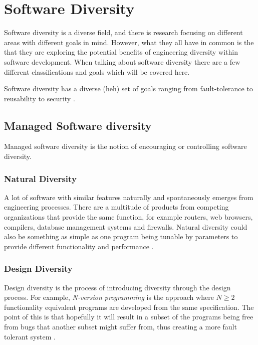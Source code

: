 \section{Software Diversity}

Software diversity is a diverse field, and there is research focusing on different areas
with different goals in mind. However, what they all have in common is the that they are
exploring the potential benefits of engineering diversity within software development.
When talking about software diversity there are a few different classifications and goals
\cite[Section~1]{survey} which will be covered here.

Software diversity has a diverse (heh) set of goals ranging from fault-tolerance to reusability
to security \cite{survey}.

\subsection{Managed Software diversity}

Managed software diversity is the notion of encouraging or controlling software diversity.

\subsubsection{Natural Diversity}

A lot of software with similar features naturally and spontaneously emerges from engineering
processes. There are a multitude of products from competing organizations that provide
the same function, for example routers, web browsers, compilers, database management systems
and firewalls. Natural diversity could also be something as simple as one program being
tunable by parameters to provide different functionality and performance \cite{survey}.

\subsubsection{Design Diversity}

Design diversity is the process of introducing diversity through the design process. For
example, \textit{N-version programming} is the approach where $N \geq 2$ functionality equivalent
programs are developed from the same specification. The point of this is that hopefully
it will result in a subset of the programs being free from bugs that another subset
might suffer from, thus creating a more fault tolerant system \cite{n-version}.

